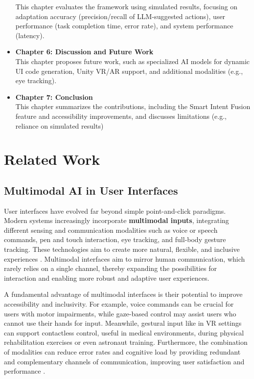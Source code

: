 \documentclass[openany]{book}
\begin{document}
\begin{itemize}
    This chapter evaluates the framework using simulated results, focusing on adaptation accuracy (precision/recall of LLM-suggested actions), user performance (task completion time, error rate), and system performance (latency).
    \item \textbf{Chapter 6: Discussion and Future Work} \\
    This chapter proposes future work, such as specialized AI models for dynamic UI code generation, Unity VR/AR support, and additional modalities (e.g., eye tracking).
    \item \textbf{Chapter 7: Conclusion} \\
    This chapter summarizes the contributions, including the Smart Intent Fusion feature and accessibility improvements, and discusses limitations (e.g., reliance on simulated results)
\end{itemize}

\chapter{Related Work}
\section{Multimodal AI in User Interfaces}

User interfaces have evolved far beyond simple point-and-click paradigms. Modern systems increasingly incorporate \textbf{multimodal inputs}, integrating different sensing and communication modalities such as voice or speech commands, pen and touch interaction, eye tracking, and full-body gesture tracking. These technologies aim to create more natural, flexible, and inclusive experiences \cite{10.1145/319382.319398}. Multimodal interfaces aim to mirror human communication, which rarely relies on a single channel, thereby expanding the possibilities for interaction and enabling more robust and adaptive user experiences. 

A fundamental advantage of multimodal interfaces is their potential to improve accessibility and inclusivity. For example, voice commands can be crucial for users with motor impairments, while gaze-based control may assist users who cannot use their hands for input. Meanwhile, gestural input like in VR settings can support contactless control, useful in medical environments, during physical rehabilitation exercises or even astronaut training. Furthermore, the combination of modalities can reduce error rates and cognitive load by providing redundant and complementary channels of communication, improving user satisfaction and performance \cite{10.1145/319382.319398}.
\end{document}
